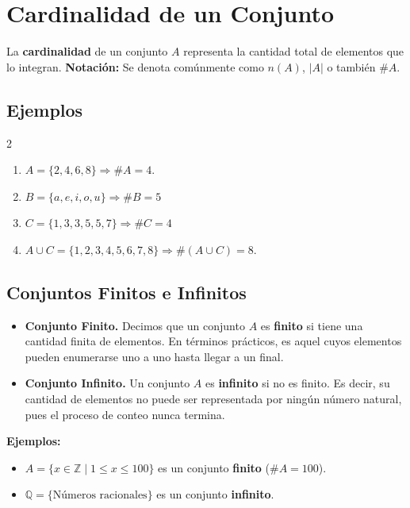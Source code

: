 \documentclass[12pt]{article}
\begin{document}
\section{Cardinalidad de un Conjunto}

La \textbf{cardinalidad} de un conjunto $A$ representa la cantidad total de elementos que lo integran. \textbf{Notación:} Se denota comúnmente como $n(A)$, $|A|$ o también $\#A$.
\subsection*{Ejemplos}
\begin{multicols}{2}
\begin{enumerate}
    \item $A=\{2,4,6,8\} \Rightarrow
\#A=4.$
\item $ B=\{a,e,i,o,u\}
\Rightarrow\#B=5
$

\item $C=\{1,3,3,5,5,7\} \Rightarrow\#C=4$

\item $
A\cup C =\{1, 2, 3, 4, 5, 6, 7, 8\} \Rightarrow
\#(A\cup C)= 8.
$

\end{enumerate}

\end{multicols}
\subsection*{Conjuntos Finitos e Infinitos}

\begin{itemize}
    \item \textbf{Conjunto Finito.} Decimos que un conjunto $A$ es \textbf{finito} si tiene una cantidad finita de elementos. En términos prácticos, es aquel cuyos elementos pueden enumerarse uno a uno hasta llegar a un final.
    
    \item \textbf{Conjunto Infinito. } Un conjunto $A$ es \textbf{infinito} si no es finito. Es decir, su cantidad de elementos no puede ser representada por ningún número natural, pues el proceso de conteo nunca termina.
\end{itemize}


\textbf{Ejemplos:}
\begin{itemize}
    \item $A = \{ x \in \mathbb{Z} \mid 1 \leq x \leq 100 \}$ es un conjunto \textbf{finito} ($\#A = 100$).
    \item $\mathbb{Q} = \{ \text{Números racionales} \}$ es un conjunto \textbf{infinito}.
\end{itemize}
\end{document}
